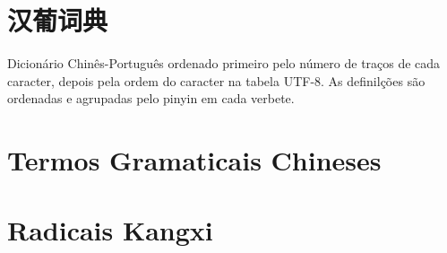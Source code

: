 \documentclass[a4paper,9pt,twoside,openany]{memoir}
\begin{document}



\clearpage
\pagestyle{empty}
\tableofcontents

\clearpage
\pagestyle{empty}
\chapter{汉葡词典}

%
%

Dicionário Chinês-Português ordenado primeiro pelo número de traços
de cada caracter, depois pela ordem do caracter na tabela UTF-8.
As definilções são ordenadas e agrupadas pelo pinyin em cada verbete.

\clearpage
\pagestyle{dicionario}
\begin{multicols}{2}






















%
%
%
%
%
\end{multicols}

\clearpage
\pagestyle{plain}
\chapter{Termos Gramaticais Chineses}


\clearpage
\pagestyle{plain}
\chapter{Radicais Kangxi}


\printindex[sradical]
\end{document}
